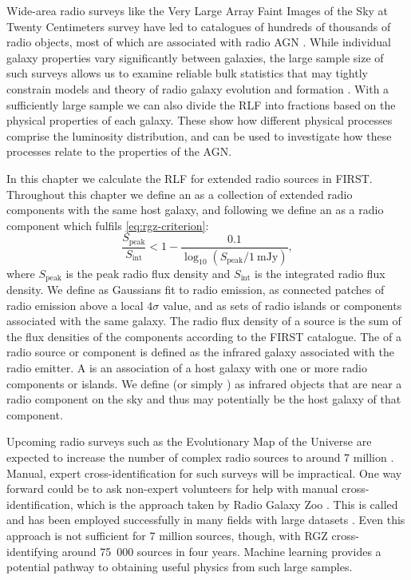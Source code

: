 Wide-area radio surveys like the Very Large Array Faint Images of the Sky at
Twenty Centimeters survey \citep[FIRST;][]{white97first} have led to
catalogues of hundreds of thousands of radio objects, most of which are
associated with radio AGN \citep{sadler02rlf}. While individual galaxy
properties vary significantly between galaxies, the large sample size of
such surveys allows us to examine reliable bulk statistics that may
tightly constrain models and theory of radio galaxy evolution and formation \citep{condon92radio}. With a
sufficiently large sample \citep[of size $N$ such that $N \gg
\sqrt{N}$;][]{condon91rlf} we can also divide the RLF into fractions based
on the physical properties of each galaxy. These  show
how different physical processes comprise the luminosity distribution, and
can be used to investigate how these processes relate to the properties of
the AGN.

In this chapter we calculate the RLF for extended radio sources in FIRST. Throughout this chapter we define an  as a collection of extended radio components with the same host galaxy, and following
\citet{banfield15} we define an  as a radio
component which fulfils \autoref{eq:rgz-criterion}:
\begin{equation}
    \frac{S_{\mathrm{peak}}}{S_{\mathrm{int}}} < 1 - \frac{0.1}{\log_{10}(S_{\mathrm{peak}} / 1\ \mathrm{mJy})},
    \label{eq:rgz-criterion}
\end{equation}
where $S_{\mathrm{peak}}$ is the peak radio flux density and
$S_{\mathrm{int}}$ is the integrated radio flux density. We define  as Gaussians fit to
radio emission,  as connected patches of radio emission
above a local $4\sigma$ value, and  as sets of radio
islands or components associated with the same galaxy. The radio flux density of a source is the sum of the flux densities of the components according to the FIRST catalogue. The  of a radio source or component is defined as the infrared galaxy
associated with the radio emitter. A  is an
association of a host galaxy with one or more radio components or islands. We
define  (or simply
) as infrared objects that are near a radio component on
the sky and thus may potentially be the host galaxy of that component.

Upcoming
radio surveys such as the Evolutionary Map of the Universe
\citep[EMU;][]{norris11} are expected to increase the number
of complex radio sources to around 7 million \citep{banfield15}. Manual, expert cross-identification for such surveys will be impractical. One way forward could be to ask non-expert volunteers for help with manual cross-identification, which is the approach taken by Radio Galaxy Zoo \citep[RGZ;][]{banfield15}. This is called  and has been employed successfully in many fields with large datasets \citep{marshall15citizen}. Even this approach is not sufficient for 7 million sources, though, with RGZ cross-identifying around 75~000 sources in four years. Machine
learning provides a potential pathway to obtaining useful physics from such
large samples.

